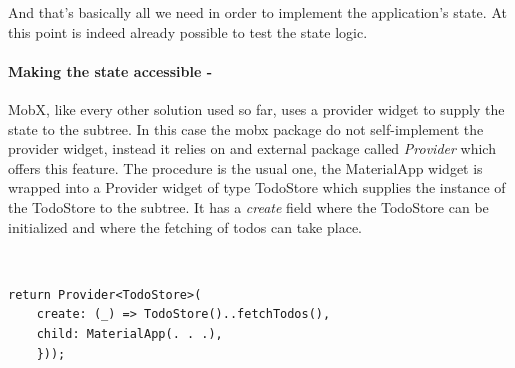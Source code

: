 And that’s basically all we need in order to implement the application’s state. At this point is indeed already possible to test the state logic.

\paragraph{Making the state accessible - }
\label{subpar:todo_app_bloc_core_state} MobX, like every other solution used so far, uses a provider widget to supply the state to the subtree. In this case the mobx package do not self-implement the provider widget, instead it relies on and external package called \textit{Provider} which offers this feature. The procedure is the usual one, the MaterialApp widget is wrapped into a Provider widget of type TodoStore which supplies the instance of the TodoStore to the subtree. It has a \textit{create} field where the TodoStore can be initialized and where the fetching of todos can take place.
\begin{code}
\mbox{}\\
 \mbox{}
		\label{code:2.14}
\begin{verbatim}
return Provider<TodoStore>(
    create: (_) => TodoStore()..fetchTodos(),
    child: MaterialApp(. . .),
    }));
\end{verbatim}
\mbox{}
\end{code}



